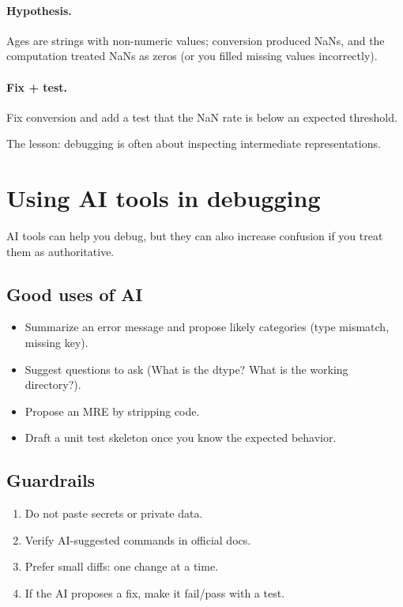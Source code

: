 \paragraph{Hypothesis.} Ages are strings with non-numeric values; conversion produced NaNs, and the computation treated NaNs as zeros (or you filled missing values incorrectly).

\paragraph{Fix + test.} Fix conversion and add a test that the NaN rate is below an expected threshold.

The lesson: debugging is often about inspecting intermediate representations.

\section{Using AI tools in debugging}
AI tools can help you debug, but they can also increase confusion if you treat them as authoritative.

\subsection{Good uses of AI}
\begin{itemize}[noitemsep]
  \item Summarize an error message and propose likely categories (type mismatch, missing key).
  \item Suggest questions to ask (What is the dtype? What is the working directory?).
  \item Propose an MRE by stripping code.
  \item Draft a unit test skeleton once you know the expected behavior.
\end{itemize}

\subsection{Guardrails}
\begin{enumerate}[noitemsep]
  \item Do not paste secrets or private data.
  \item Verify AI-suggested commands in official docs.
  \item Prefer small diffs: one change at a time.
  \item If the AI proposes a fix, make it fail/pass with a test.
\end{enumerate}

